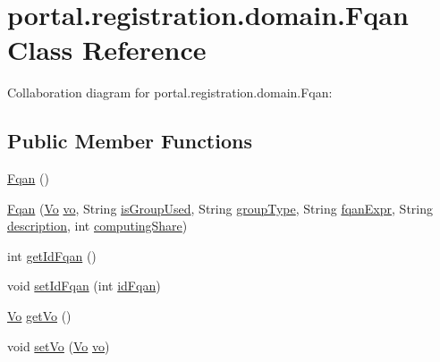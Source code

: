 \hypertarget{classportal_1_1registration_1_1domain_1_1Fqan}{
\section{portal.registration.domain.Fqan Class Reference}
\label{classportal_1_1registration_1_1domain_1_1Fqan}
}


Collaboration diagram for portal.registration.domain.Fqan:
\subsection*{Public Member Functions}
\begin{DoxyCompactItemize}
\item 
\hyperlink{classportal_1_1registration_1_1domain_1_1Fqan_a57ba44619c0501b932a3a021e01e986a}{Fqan} ()
\item 
\hyperlink{classportal_1_1registration_1_1domain_1_1Fqan_a3bdacc907ca5bc2e51d15c7f1aea8107}{Fqan} (\hyperlink{classportal_1_1registration_1_1domain_1_1Vo}{Vo} \hyperlink{classportal_1_1registration_1_1domain_1_1Fqan_a8e4e4b03f04876190df45dc42f536a83}{vo}, String \hyperlink{classportal_1_1registration_1_1domain_1_1Fqan_a18a759a4901fefe12b28418fd4fc054c}{isGroupUsed}, String \hyperlink{classportal_1_1registration_1_1domain_1_1Fqan_ab172b872fc284fb1f5c0ebb198a5c98a}{groupType}, String \hyperlink{classportal_1_1registration_1_1domain_1_1Fqan_a8fee3ab195a29cf4e56f5b7ea9226e3a}{fqanExpr}, String \hyperlink{classportal_1_1registration_1_1domain_1_1Fqan_a75b560547e2591fb42c279e8b1bcc782}{description}, int \hyperlink{classportal_1_1registration_1_1domain_1_1Fqan_a05ebf08182a037b4cbb4b27053e76ebc}{computingShare})
\item 
int \hyperlink{classportal_1_1registration_1_1domain_1_1Fqan_a548a2e9c3aa2c48e08301cfcb9fe002c}{getIdFqan} ()
\item 
void \hyperlink{classportal_1_1registration_1_1domain_1_1Fqan_a131983a7e7509b35880c37cb7f558d29}{setIdFqan} (int \hyperlink{classportal_1_1registration_1_1domain_1_1Fqan_ad84508e79770bdb6de564d288f498ac6}{idFqan})
\item 
\hyperlink{classportal_1_1registration_1_1domain_1_1Vo}{Vo} \hyperlink{classportal_1_1registration_1_1domain_1_1Fqan_a5016f7a27dd312be0d64e5657cac1ef2}{getVo} ()
\item 
void \hyperlink{classportal_1_1registration_1_1domain_1_1Fqan_a09109e1d4254bd8a804bf84fe11dc134}{setVo} (\hyperlink{classportal_1_1registration_1_1domain_1_1Vo}{Vo} \hyperlink{classportal_1_1registration_1_1domain_1_1Fqan_a8e4e4b03f04876190df45dc42f536a83}{vo})

\end{DoxyCompactItemize}
